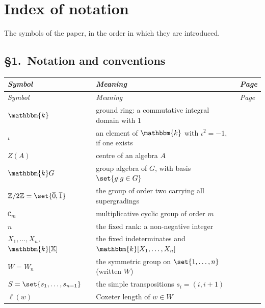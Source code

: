 \documentclass[a4paper,11pt]{amsart}
\let\ov\overline
\numberwithin{equation}{subsection}
\theoremstyle{definition}
\theoremstyle{theorem}
\theoremstyle{remark}
\newcommand\Sym{W}
\newcommand\Ztwo{\mathbb{Z}/2\mathbb{Z}}
\newcommand\X{\mathbb{X}}
\newcommand\kk{\mathbbm{k}}
\begin{document}
\makeatletter
\newcommand{\where}[1]{\@ifundefined{r@#1}{}{\pageref{#1}}}
\newcommand{\alsowhere}[1]{\@ifundefined{r@#1}{}{, \pageref{#1}}}
\makeatother
\newenvironment{notationtable}[1]
  {\subsection*{#1}\small
   \begin{longtable}{@{}p{0.225\textwidth}@{\hspace{1em}}p{0.635\textwidth}@{\hspace{0.6em}}p{0.085\textwidth}@{}}
   \toprule \emph{Symbol} & \emph{Meaning} & \emph{Page}\\ \midrule \endfirsthead
   \toprule \emph{Symbol} & \emph{Meaning} & \emph{Page}\\ \midrule \endhead
   \bottomrule \endfoot}
  {\end{longtable}}

\section*{Index of notation}\label{S:index}
\noindent
The symbols of the paper, in the order in which they are introduced.
\begin{notationtable}{\S1.\ Notation and conventions}
$\kk$ & ground ring: a commutative integral domain with $1$ & \where{S:notation}\\
$\iota$ & an element of $\kk$ with $\iota^{2}=-1$, if one exists & \where{S:notation}\\
$Z(A)$ & centre of an algebra $A$ & \where{S:notation}\\
$\kk G$ & group algebra of $G$, with basis $\set{g|g\in G}$ & \where{S:notation}\\
$\Ztwo=\set{\ov0,\ov1}$ & the group of order two carrying all supergradings & \where{S:notation}\\
$\mathtt{C}_m$ & multiplicative cyclic group of order $m$ & \where{S:notation}\\
$n$ & the fixed rank: a non-negative integer & \where{S:notation}\\
$X_1,\dots,X_n$, $\kk[\X]$ & the fixed indeterminates and $\kk[X_1,\dots,X_n]$ & \where{S:notation}\\
$\Sym=\Sym_n$ & the symmetric group on $\set{1,\dots,n}$ (written $W$) & \where{S:notation}\\
$S=\set{s_1,\dots,s_{n-1}}$ & the simple transpositions $s_i=(i,i+1)$ & \where{S:notation}\\
$\ell(w)$ & Coxeter length of $w\in\Sym$ & \where{S:notation}\\
\end{notationtable}
\end{document}
